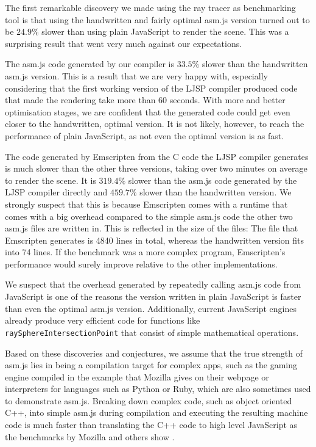 \documentclass[11pt]{report}
\begin{document}
The first remarkable discovery we made using the ray tracer as benchmarking tool is that using the handwritten and fairly optimal asm.js version turned out to be $24.9\%$ slower than using plain JavaScript to render the scene. This was a surprising result that went very much against our expectations.

The asm.js code generated by our compiler is $33.5\%$ slower than the handwritten asm.js version. This is a result that we are very happy with, especially considering that the first working version of the LJSP compiler produced code that made the rendering take more than 60 seconds. With more and better optimisation stages, we are confident that the generated code could get even closer to the handwritten, optimal version. It is not likely, however, to reach the performance of plain JavaScript, as not even the optimal version is as fast.

The code generated by Emscripten from the C code the LJSP compiler generates is much slower than the other three versions, taking over two minutes on average to render the scene. It is $319.4\%$ slower than the asm.js code generated by the LJSP compiler directly and $459.7\%$ slower than the handwritten version. We strongly suspect that this is because Emscripten comes with a runtime that comes with a big overhead compared to the simple asm.js code the other two asm.js files are written in. This is reflected in the size of the files: The file that Emscripten generates is 4840 lines in total, whereas the handwritten version fits into 74 lines. If the benchmark was a more complex program, Emscripten's performance would surely improve relative to the other implementations.

We suspect that the overhead generated by repeatedly calling asm.js code from JavaScript is one of the reasons the version written in plain JavaScript is faster than even the optimal asm.js version. Additionally, current JavaScript engines already produce very efficient code for functions like \texttt{raySphereIntersectionPoint} that consist of simple mathematical operations.

Based on these discoveries and conjectures, we assume that the true strength of asm.js lies in being a compilation target for complex apps, such as the gaming engine compiled in the example that Mozilla gives on their webpage or interpreters for languages such as Python or Ruby, which are also sometimes used to demonstrate asm.js. Breaking down complex code, such as object oriented C++, into simple asm.js during compilation and executing the resulting machine code is much faster than translating the C++ code to high level JavaScript as the benchmarks by Mozilla and others show \cite{asmjsbenchmarks}.
\end{document}
